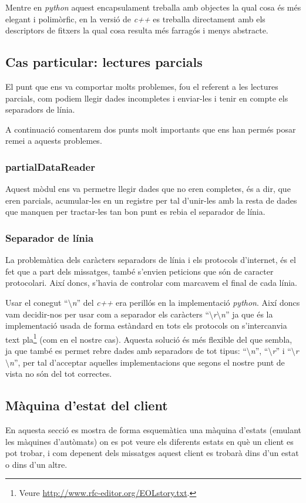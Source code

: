 \documentclass[a4paper,10pt]{article}
\begin{document}
	Mentre en \emph{python} aquest encapsulament treballa amb objectes la qual cosa és més elegant i polimòrfic, en la versió de \emph{c++} es treballa directament amb els descriptors de fitxers la qual cosa resulta més farragós i menys abstracte.

	\subsection{Cas particular: lectures parcials}
	El punt que ens va comportar molts problemes, fou el referent a les lectures parcials, com podiem llegir dades incompletes i enviar-les i tenir en compte els separadors de línia.

	A continuació comentarem dos punts molt importants que ens han permés posar remei a aquests problemes.

		\subsubsection{partialDataReader}
		Aquest mòdul ens va permetre llegir dades que no eren completes, és a dir, que eren parcials, acumular-les en un registre per tal d'unir-les amb la resta de dades que manquen per tractar-les tan bon punt es rebia el separador de línia.

		\subsubsection{Separador de línia}
		La problemàtica dels caràcters separadors de línia i els protocols d'internet, és el fet que a part dels missatges, també s'envien peticions que són de caracter protocolari. Així doncs, s'havia de controlar com marcavem el final de cada línia.
		
		Usar el conegut ``\emph{$\setminus$n}'' del \emph{c++} era perillós en la implementació \emph{python}. Així doncs vam decidir-nos per usar com a separador els caràcters ``\emph{$\setminus$r$\setminus$n}'' ja que és la implementació usada de forma estàndard en tots els protocols on s'intercanvia text pla\footnote{Veure \url{http://www.rfc-editor.org/EOLstory.txt}.} (com en el nostre cas). Aquesta solució és més flexible del que sembla, ja que també es permet rebre dades amb separadors de tot tipus: ``\emph{$\setminus$n}'', ``\emph{$\setminus$r}'' i ``\emph{$\setminus$r$\setminus$n}'', per tal d'acceptar aquelles implementacions que segons el nostre punt de vista no són del tot correctes.


	\subsection{Màquina d'estat del client}
	En aquesta secció es mostra de forma esquemàtica una màquina d'estats (emulant les màquines d'autòmats) on es pot veure els diferents estats en què un client es pot trobar, i com depenent dels missatges aquest client es trobarà dins d'un estat o dins d'un altre.
\end{document}
